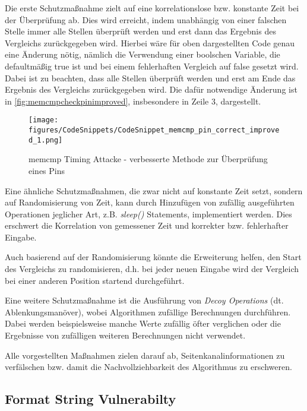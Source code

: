\documentclass[a4paper,
DIV=13,
12pt,
BCOR=10mm,
department=FakIM,
oneside,
parskip=half,
automark,
listof=totocnumbered,
bibliography=totocnumbered,
acronym=totocnumbered
] {OTHRartcl}
\begin{document}
Die erste Schutzmaßnahme zielt auf eine korrelationslose bzw. konstante Zeit bei der Überprüfung ab. Dies wird erreicht, indem unabhängig
von einer falschen Stelle immer alle Stellen überprüft werden und erst dann das Ergebnis des Vergleichs zurückgegeben wird.
Hierbei wäre für oben dargestellten Code genau eine Änderung nötig, nämlich die Verwendung einer boolschen Variable,
die defaultmäßig true ist und bei einem fehlerhaften Vergleich auf false gesetzt wird. Dabei ist zu beachten, dass
alle Stellen überprüft werden und erst am Ende das Ergebnis des Vergleichs zurückgegeben wird. Die dafür notwendige Änderung ist in \autoref{fig:memcmpcheckpinimproved}, insbesondere in Zeile 3, dargestellt.
\begin{figure}[ht!]
  \begin{center}
    \texttt{[image: figures/CodeSnippets/CodeSnippet\_memcmp\_pin\_correct\_improved\_1.png]}
    \caption{memcmp Timing Attacke - verbesserte Methode zur Überprüfung eines Pins}
    \label{fig:memcmpcheckpinimproved}
  \end{center}
\end{figure}
Eine ähnliche Schutzmaßnahmen, die zwar nicht auf konstante Zeit setzt, sondern auf Randomisierung von Zeit, kann durch Hinzufügen von
zufällig ausgeführten Operationen jeglicher Art, z.B. \textit{sleep()} Statements, implementiert werden. Dies erschwert die Korrelation von gemessener Zeit und korrekter bzw. fehlerhafter Eingabe.

Auch basierend auf der Randomisierung könnte die Erweiterung helfen, den Start des Vergleichs zu randomisieren, d.h. bei jeder neuen Eingabe wird der Vergleich bei
einer anderen Position startend durchgeführt.

Eine weitere Schutzmaßnahme ist die Ausführung von \textit{Decoy Operations} (dt. Ablenkungsmanöver), wobei Algorithmen zufällige Berechnungen durchführen.
Dabei werden beispielsweise manche Werte zufällig öfter verglichen oder die Ergebnisse von zufälligen weiteren Berechnungen nicht verwendet. \cite{Hardware Hacking Handbook Chapter 14}

Alle vorgestellten Maßnahmen zielen darauf ab, Seitenkanalinformationen zu verfälschen bzw. damit die Nachvollziehbarkeit des Algorithmus zu erschweren.

\subsection{Format String Vulnerabilty}
\end{document}
